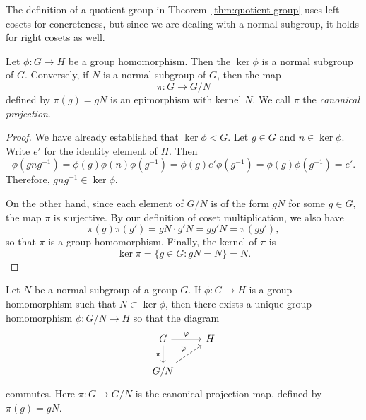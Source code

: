 \begin{remark}
    The definition of a quotient group in Theorem~\ref{thm:quotient-group} uses
    left cosets for concreteness, but since we are dealing with a normal
    subgroup, it holds for right cosets as well.
\end{remark}

\begin{theorem}
    Let \(\phi : G \to H\) be a group homomorphism. Then the \(\ker \phi\) is a
    normal subgroup of \(G\). Conversely, if \(N\) is a normal subgroup of
    \(G\), then the map
    \[
        \pi : G \to G/N
    \]
    defined by \(\pi(g) = gN\) is an epimorphism with kernel \(N\). We call
    \(\pi\) the \emph{canonical projection}.
\end{theorem}

\begin{proof}
    We have already established that \(\ker \phi < G\). Let \(g \in G\) and \(n
    \in \ker \phi\). Write \(e'\) for the identity element of \(H\). Then
    \[
        \phi(gng^{-1}) = \phi(g)\phi(n)\phi(g^{-1}) = \phi(g)e'\phi(g^{-1}) = \phi(g)\phi(g^{-1}) = e'.
    \]
    Therefore, \(gng^{-1} \in \ker \phi\).

    On the other hand, since each element of \(G/N\) is of the form \(gN\) for
    some \(g \in G\), the map \(\pi\) is surjective. By our definition of coset
    multiplication, we also have
    \[
        \pi(g)\pi(g') = gN \cdot g'N = gg'N = \pi(gg'),
    \]
    so that \(\pi\) is a group homomorphism. Finally, the kernel of \(\pi\) is
    \[
        \ker \pi = \{g \in G : gN = N\} = N.
    \]
\end{proof}

\begin{theorem}
    \label{thm:induced-homomorphism}
    Let \(N\) be a normal subgroup of a group \(G\). If \(\phi: G \to H\) is a
    group homomorphism such that \(N \subset \ker \phi\), then there exists a
    unique group homomorphism \(\overline{\phi}: G/N \to H\) so that the diagram
    \[
        \begin{tikzcd}
            G \arrow{r}{\phi} \arrow[swap]{d}{\pi} & H \\
            G/N \arrow[dashed]{ur}{\overline{\phi}}
        \end{tikzcd}
    \]
    commutes. Here \(\pi: G \to G/N\) is the canonical projection map, defined
    by \(\pi(g) = gN\).
\end{theorem}

